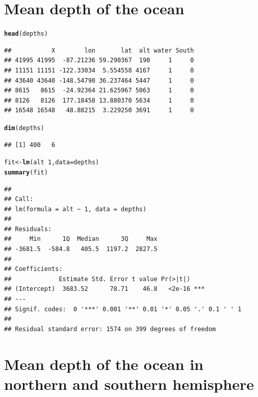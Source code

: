 \documentclass[landscape,twocolumn,letterpaper,9pt,reqno]{article}\usepackage[]{graphicx}\usepackage[]{color}
\newcommand{\hlnum}[1]{\textcolor[rgb]{0.686,0.059,0.569}{#1}}%
\newcommand{\hlopt}[1]{\textcolor[rgb]{0,0,0}{#1}}%
\newcommand{\hlstd}[1]{\textcolor[rgb]{0.345,0.345,0.345}{#1}}%
\newcommand{\hlkwb}[1]{\textcolor[rgb]{0.69,0.353,0.396}{#1}}%
\newcommand{\hlkwc}[1]{\textcolor[rgb]{0.333,0.667,0.333}{#1}}%
\newcommand{\hlkwd}[1]{\textcolor[rgb]{0.737,0.353,0.396}{\textbf{#1}}}%
\newenvironment{knitrout}{}{} %
\begin{document}
\section{Mean depth of the ocean}




\begin{knitrout}
\color{fgcolor}
\begin{alltt}
\hlkwd{head}\hlstd{(depths)}
\end{alltt}
\begin{verbatim}
##           X        lon       lat  alt water South
## 41995 41995  -87.21236 59.290367  190     1     0
## 11151 11151 -122.33034  5.554558 4167     1     0
## 43640 43640 -148.54790 36.237464 5447     1     0
## 8615   8615  -24.92364 21.625967 5063     1     0
## 8126   8126  177.18458 13.880370 5634     1     0
## 16548 16548   48.88215  3.229250 3691     1     0
\end{verbatim}
\begin{alltt}
\hlkwd{dim}\hlstd{(depths)}
\end{alltt}
\begin{verbatim}
## [1] 400   6
\end{verbatim}
\begin{alltt}
\hlstd{fit} \hlkwb{<-} \hlkwd{lm}\hlstd{(alt} \hlopt{~} \hlnum{1}\hlstd{,} \hlkwc{data} \hlstd{= depths)}
\hlkwd{summary}\hlstd{(fit)}
\end{alltt}
\begin{verbatim}
## 
## Call:
## lm(formula = alt ~ 1, data = depths)
## 
## Residuals:
##     Min      1Q  Median      3Q     Max 
## -3681.5  -584.8   405.5  1197.2  2827.5 
## 
## Coefficients:
##             Estimate Std. Error t value Pr(>|t|)    
## (Intercept)  3683.52      78.71    46.8   <2e-16 ***
## ---
## Signif. codes:  0 '***' 0.001 '**' 0.01 '*' 0.05 '.' 0.1 ' ' 1
## 
## Residual standard error: 1574 on 399 degrees of freedom
\end{verbatim}

\end{knitrout}
	

\clearpage
	
\section{Mean depth of the ocean in northern and southern hemisphere}
\end{document}
